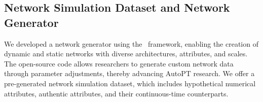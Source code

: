 \subsection{Network Simulation Dataset and Network Generator}

We developed a network generator using the \modelsim~framework, enabling the creation of dynamic and static networks with diverse architectures, attributes, and scales. The open-source code allows researchers to generate custom network data through parameter adjustments, thereby advancing AutoPT research. We offer a pre-generated network simulation dataset, which includes hypothetical numerical attributes, authentic attributes, and their continuous-time counterparts.






